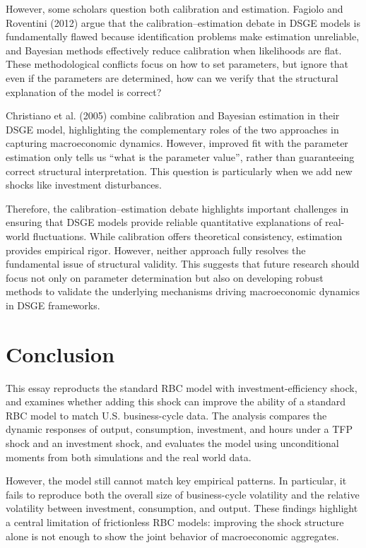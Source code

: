\documentclass[12pt]{article}
\begin{document}
However, some scholars question both calibration and estimation. Fagiolo and Roventini (2012) argue that the calibration–estimation debate in DSGE models is fundamentally flawed because identification problems make estimation unreliable, and Bayesian methods effectively reduce calibration when likelihoods are flat. These methodological conflicts focus on how to set parameters, but ignore that even if the parameters are determined, how can we verify that the structural explanation of the model is correct? 

Christiano et al. (2005) combine calibration and Bayesian estimation in their DSGE model, highlighting the complementary roles of the two approaches in capturing macroeconomic dynamics. However, improved fit with the parameter estimation only tells us “what is the parameter value”, rather than guaranteeing correct structural interpretation. This question is particularly when we add new shocks like investment disturbances.

Therefore, the calibration–estimation debate highlights important challenges in ensuring that DSGE models provide reliable quantitative explanations of real-world fluctuations. While calibration offers theoretical consistency, estimation provides empirical rigor. However, neither approach fully resolves the fundamental issue of structural validity. This suggests that future research should focus not only on parameter determination but also on developing robust methods to validate the underlying mechanisms driving macroeconomic dynamics in DSGE frameworks.

\section{Conclusion}
This essay reproducts the standard RBC model with investment-efficiency shock, and examines whether adding this shock can improve the ability of a standard RBC model to match U.S. business-cycle data. The analysis compares the dynamic responses of output, consumption, investment, and hours under a TFP shock and an investment shock, and evaluates the model using unconditional moments from both simulations and the real world data.

However, the model still cannot match key empirical patterns. In particular, it fails to reproduce both the overall size of business-cycle volatility and the relative volatility between investment, consumption, and output.
These findings highlight a central limitation of frictionless RBC models: improving the shock structure alone is not enough to show the joint behavior of macroeconomic aggregates.
\end{document}

